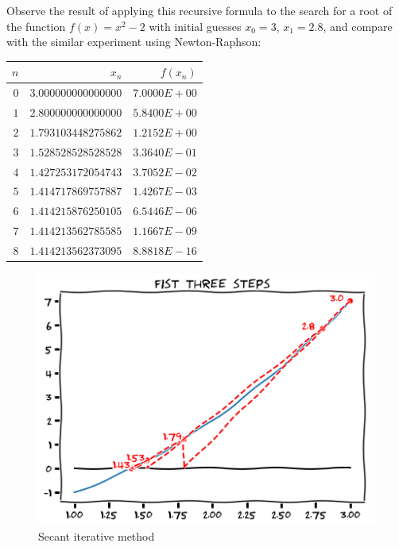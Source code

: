 \begin{example}
Observe the result of applying this recursive formula to the search for a root of the function $f(x) = x^2-2$ with initial guesses $x_0 = 3$, $x_1=2.8
$, and compare with the similar experiment using Newton-Raphson:
\begin{center}
\begin{tabular}{|r|r|r|} \hline
$n$ & $x_n$ & $f(x_n)$ \\ \hline \hline
$0$ & $3.000000000000000$ & $7.0000E+00$ \\ \hline
$1$ & $2.800000000000000$ & $5.8400E+00$ \\ \hline
$2$ & $1.793103448275862$ & $1.2152E+00$ \\ \hline
$3$ & $1.528528528528528$ & $3.3640E-01$ \\ \hline
$4$ & $1.427253172054743$ & $3.7052E-02$ \\ \hline
$5$ & $1.414717869757887$ & $1.4267E-03$ \\ \hline
$6$ & $1.414215876250105$ & $6.5446E-06$ \\ \hline
$7$ & $1.414213562785585$ & $1.1667E-09$ \\ \hline
$8$ & $1.414213562373095$ & $8.8818E-16$ \\ \hline
\end{tabular}
\end{center}
\begin{figure}[ht!]
\includegraphics[width=0.6\linewidth]{images/secant.png}
\caption{Secant iterative method}\label{figure:SecantMethod}
\end{figure}
\end{example}